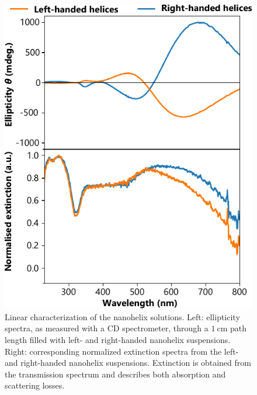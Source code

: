 \begin{figure}[htb!]	
    \centering	
    \includegraphics[scale=1]{./figures/results/HRS/linear_data.pdf}
    \caption{\label{fig:results:HRS:linear_data}
    Linear characterization of the nanohelix solutions. Left: ellipticity spectra, as measured with a CD spectrometer, through a $\SI{1}{\centi\m}$ path length filled with left- and right-handed nanohelix suspensions. Right: corresponding normalized extinction spectra from the left- and right-handed nanohelix suspensions. Extinction is obtained from the transmission spectrum and describes both absorption and scattering losses.}	
\end{figure}

